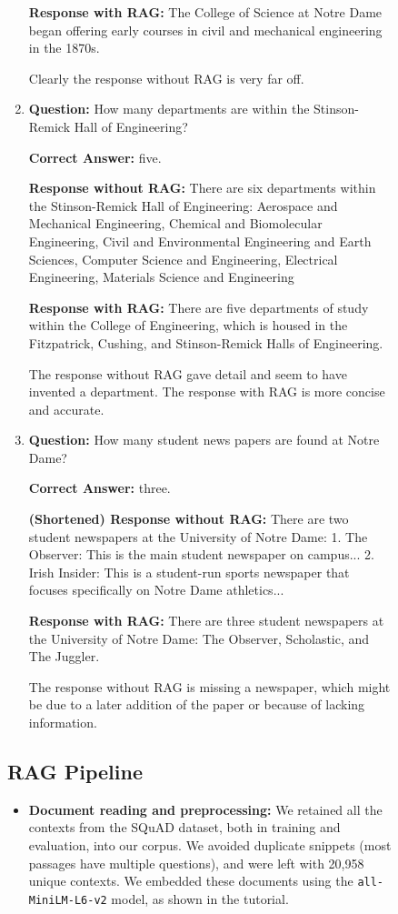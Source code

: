 \documentclass[12pt]{article}
\begin{document}
\begin{figure}[H]
\begin{enumerate}
    \textbf{Response with RAG:} The College of Science at Notre Dame began offering early courses in civil and mechanical engineering in the 1870s.
    
    Clearly the response without RAG is very far off.

    \item \textbf{Question:} How many departments are within the Stinson-Remick Hall of Engineering?
    
    \textbf{Correct Answer:} five.

    \textbf{Response without RAG:} There are six departments within the Stinson-Remick Hall of Engineering: 
    Aerospace and Mechanical Engineering,
    Chemical and Biomolecular Engineering,
    Civil and Environmental Engineering and Earth Sciences,
    Computer Science and Engineering,
    Electrical Engineering,
    Materials Science and Engineering 

    \textbf{Response with RAG:} There are five departments of study within the College of Engineering, which is housed in the Fitzpatrick, Cushing, and Stinson-Remick Halls of Engineering.

    The response without RAG gave detail and seem to have invented a department. The response with RAG is more concise and accurate.

    \item \textbf{Question:} How many student news papers are found at Notre Dame?
    
    \textbf{Correct Answer:} three.
    
    \textbf{(Shortened) Response without RAG:} There are two student newspapers at the University of Notre Dame: 
    1. The Observer: This is the main student newspaper on campus...
    2. Irish Insider: This is a student-run sports newspaper that focuses specifically on Notre Dame athletics...

    \textbf{Response with RAG:} There are three student newspapers at the University of Notre Dame: The Observer, Scholastic, and The Juggler.  

    The response without RAG is missing a newspaper, which might be due to a later addition of the paper or because of lacking information. 
\end{enumerate}

\subsection{RAG Pipeline}

\begin{itemize}
    \item \textbf{Document reading and preprocessing:} We retained all the contexts from the SQuAD dataset, both in training and evaluation, into our corpus. We avoided duplicate snippets (most passages have multiple questions), and were left with 20,958 unique contexts.
    We embedded these documents using the \texttt{all-MiniLM-L6-v2} model, as shown in the tutorial.
    

\end{itemize}
\end{figure}
\end{document}
